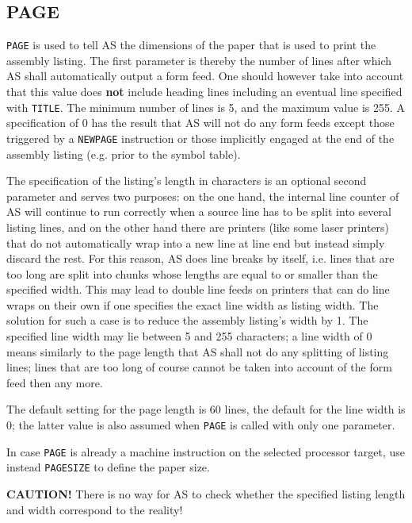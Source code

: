 \documentclass[12pt,twoside]{report}
\makeatletter
\newcommand{\bb}[1]{{\bf #1}}
\newcommand{\tty}[1]{{\tt #1}}
\newcommand{\ttindex}[1]{\index{#1@{\tt #1}}}
\makeatother
\begin{document}

\subsection{PAGE}
\ttindex{PAGE}

\tty{PAGE} is used to tell AS the dimensions of the paper that is used to
print the assembly listing.  The first parameter is thereby the
number of lines after which AS shall automatically output a form
feed.  One should however take into account that this value does \bb{not}
include heading lines including an eventual line specified with
\tty{TITLE}.  The minimum number of lines is 5, and the maximum value is
255.  A specification of 0 has the result that AS will not do any form
feeds except those triggered by a \tty{NEWPAGE} instruction or those
implicitly engaged at the end of the assembly listing (e.g. prior to the
symbol table).

The specification of the listing's length in characters is an
optional second parameter and serves two purposes: on the one hand,
the internal line counter of AS will continue to run correctly when a
source line has to be split into several listing lines, and on
the other hand there are printers (like some laser printers) that do
not automatically wrap into a new line at line end but instead simply
discard the rest.  For this reason, AS does line breaks by itself,
i.e. lines that are too long are split into chunks whose lengths are
equal to or smaller than the specified width.  This may lead to
double line feeds on printers that can do line wraps on their own if
one specifies the exact line width as listing width.  The solution
for such a case is to reduce the assembly listing's width by 1.  The
specified line width may lie between 5 and 255 characters; a line
width of 0 means similarly to the page length that AS shall not do
any splitting of listing lines; lines that are too long of course
cannot be taken into account of the form feed then any more.

The default setting for the page length is 60 lines, the default for the
line width is 0; the latter value is also assumed when \tty{PAGE} is
called with only one parameter.

In case \tty{PAGE} is already a machine instruction on the
selected processor target, use instead \tty{PAGESIZE} to define
the paper size.

\bb{CAUTION!}  There is no way for AS to check whether the specified
listing length and width correspond to the reality!
\end{document}
